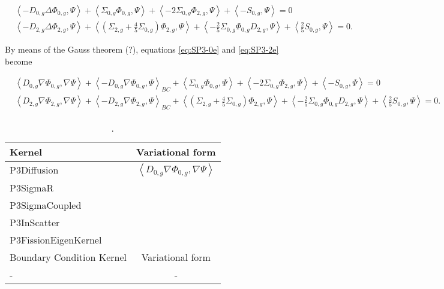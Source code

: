 \documentclass[letterpaper]{article}
\begin{document}
\begin{align}
    & \left< - D_{0,g} \Delta \Phi_{0,g}, \Psi \right> + \left< \Sigma_{0,g} \Phi_{0,g}, \Psi \right> + \left< - 2 \Sigma_{0,g} \Phi_{2,g}, \Psi \right> + \left< - S_{0,g}, \Psi \right> = 0 \label{eq:SP3-0e} \\
    & \left< - D_{2,g} \Delta \Phi_{2,g}, \Psi \right> + \left< \left( \Sigma_{2,g} + \frac{4}{5} \Sigma_{0,g} \right) \Phi_{2,g}, \Psi \right> + \left< - \frac{2}{5} \Sigma_{0,g} \Phi_{0,g} D_{2,g}, \Psi \right> + \left< \frac{2}{5} S_{0,g}, \Psi \right> = 0. \label{eq:SP3-2e}
\end{align}

By means of the Gauss theorem (?), equations \ref{eq:SP3-0e} and \ref{eq:SP3-2e} become

\begin{align}
    & \left< D_{0,g} \nabla \Phi_{0,g}, \nabla \Psi \right> + \left< - D_{0,g} \nabla \Phi_{0,g}, \Psi \right>_{BC} + \left< \Sigma_{0,g} \Phi_{0,g}, \Psi \right> + \left< - 2 \Sigma_{0,g} \Phi_{2,g}, \Psi \right> + \left< - S_{0,g}, \Psi \right> = 0 \label{eq:SP3-0e} \\
    & \left< D_{2,g} \nabla \Phi_{2,g}, \nabla \Psi \right> + \left< - D_{2,g} \nabla \Phi_{2,g}, \Psi \right>_{BC} + \left< \left( \Sigma_{2,g} + \frac{4}{5} \Sigma_{0,g} \right) \Phi_{2,g}, \Psi \right> + \left< - \frac{2}{5} \Sigma_{0,g} \Phi_{0,g} D_{2,g}, \Psi \right> + \left< \frac{2}{5} S_{0,g}, \Psi \right> = 0. \label{eq:SP3-2e}
\end{align}


\begin{table}[htbp!]
  \centering
  \caption{.}
  \begin{tabular}{lc}
  \toprule
  Kernel                & Variational form  \\
  \midrule
  P3Diffusion           & $\left< D_{0,g} \nabla \Phi_{0,g}, \nabla \Psi \right>$ \\
  P3SigmaR              &  \\
  P3SigmaCoupled        &  \\
  P3InScatter           &  \\
  P3FissionEigenKernel  &  \\
  \midrule
  Boundary Condition Kernel & Variational form  \\
  \midrule
  -          & - \\
  \bottomrule
  \end{tabular}
  \label{tab:parameters}
\end{table}
\end{document}
